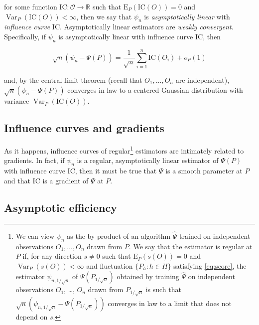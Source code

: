 \documentclass[11pt,openright,twoside]{book}
\DeclareMathOperator{\Var}{Var}
\newcommand{\bbR}{\mathbb{R}}
\newcommand{\calO}{\mathcal{O}}
\newcommand{\Exp}{\textrm{E}}
\newcommand{\IC}{\textrm{IC}}
\newcommand{\Psihat}{\widehat{\Psi}}
\theoremstyle{definition}
\theoremstyle{definition}
\theoremstyle{definition}
\theoremstyle{remark}
\begin{document}
for some function \(\IC : \calO \to \bbR\) such that \(\Exp_P(\IC(O)) = 0\) and
\(\Var_{P}(\IC(O)) < \infty\), then we say that \(\psi_n\) is \emph{asymptotically
linear} with \emph{influence curve} \(\IC\). Asymptotically linear estimators are
\emph{weakly convergent}. Specifically, if \(\psi_n\) is asymptotically linear with
influence curve \(\IC\), then

\begin{equation}
\sqrt{n}  (\psi_n  - \Psi(P))  =  \frac{1}{\sqrt{n}}  \sum_{i=1}^n \IC(O_i)  +
o_P(1) \label{eq:asymp-lin}
\end{equation}

and, by the central limit theorem (recall that \(O_{1}, \ldots, O_{n}\) are
independent), \(\sqrt{n} (\psi_n - \Psi(P))\) converges in law to a centered
Gaussian distribution with variance \(\Var_P(\IC(O))\).

\hypertarget{influence-curves-and-gradients}{%
\subsection{Influence curves and gradients}\label{influence-curves-and-gradients}}

As it happens, influence curves of regular\footnote{We can view \(\psi_{n}\) as the by
  product of an algorithm \(\Psihat\) trained on independent
  observations \(O_{1}, \ldots, O_{n}\) drawn from \(P\). We say that the estimator
  is regular at \(P\) if, for any direction \(s\neq 0\) such that \(\Exp_{P} (s(O)) = 0\) and \(\Var_{P} (s(O)) < \infty\) and fluctuation \(\{P_{h} : h \in H\}\)
  satisfying \eqref{eq:score}, the estimator \(\psi_{n,1/\sqrt{n}}\) of
  \(\Psi(P_{1/\sqrt{n}})\) obtained by training \(\Psihat\) on independent
  observations \(O_{1}\), \ldots, \(O_{n}\) drawn from \(P_{1/\sqrt{n}}\) is such that
  \(\sqrt{n} (\psi_{n,1/\sqrt{n}} - \Psi(P_{1/\sqrt{n}}))\) converges in law to a
  limit that does not depend on \(s\).} estimators are intimately related to
gradients. In fact, if \(\psi_n\) is a regular, asymptotically linear estimator
of \(\Psi(P)\) with influence curve \(\IC\), then it must be true that \(\Psi\) is a
smooth parameter at \(P\) and that \(\IC\) is a gradient of \(\Psi\) at \(P\).

\hypertarget{asymptotic-efficiency}{%
\subsection{Asymptotic efficiency}\label{asymptotic-efficiency}}
\end{document}
